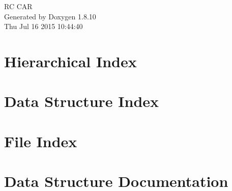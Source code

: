 \documentclass[twoside]{book}
\newcommand{\+}{\discretionary{\mbox{\scriptsize$\hookleftarrow$}}{}{}}
\newcommand{\clearemptydoublepage}{%
  \newpage{\pagestyle{empty}\cleardoublepage}%
}
\begin{document}
\hypersetup{pageanchor=false,
             bookmarks=true,
             bookmarksnumbered=true,
             pdfencoding=unicode
            }
\begin{titlepage}
\vspace*{7cm}
\begin{center}%
{\Large R\+C C\+A\+R }\\
\vspace*{1cm}
{\large Generated by Doxygen 1.8.10}\\
\vspace*{0.5cm}
{\small Thu Jul 16 2015 10:44:40}\\
\end{center}
\end{titlepage}
\clearemptydoublepage
\tableofcontents
\clearemptydoublepage
{}
\hypersetup{pageanchor=true}

\chapter{Hierarchical Index}

\chapter{Data Structure Index}

\chapter{File Index}

\chapter{Data Structure Documentation}

























\end{document}
